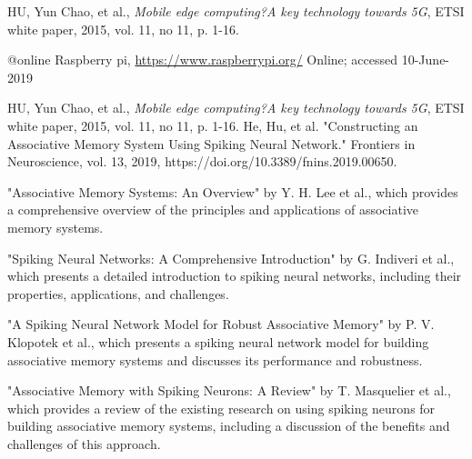 \begin{thebibliography}{99}
	 HU, Yun Chao, et al., \emph{Mobile edge computing?A key technology
		towards 5G}, ETSI white paper, 2015, vol. 11, no 11, p. 1-16.
	
	@online{ Raspberry pi,
		\url{https://www.raspberrypi.org/}
		Online; accessed 10-June-2019
	}

	 HU, Yun Chao, et al., \emph{Mobile edge computing?A key technology
		towards 5G}, ETSI white paper, 2015, vol. 11, no 11, p. 1-16.		
	He, Hu, et al. "Constructing an Associative Memory System Using Spiking Neural Network." Frontiers in Neuroscience, vol. 13, 2019, https://doi.org/10.3389/fnins.2019.00650.
\end{thebibliography}
"Associative Memory Systems: An Overview" by Y. H. Lee et al., which provides a comprehensive overview of the principles and applications of associative memory systems.

"Spiking Neural Networks: A Comprehensive Introduction" by G. Indiveri et al., which presents a detailed introduction to spiking neural networks, including their properties, applications, and challenges.

"A Spiking Neural Network Model for Robust Associative Memory" by P. V. Klopotek et al., which presents a spiking neural network model for building associative memory systems and discusses its performance and robustness.

"Associative Memory with Spiking Neurons: A Review" by T. Masquelier et al., which provides a review of the existing research on using spiking neurons for building associative memory systems, including a discussion of the benefits and challenges of this approach.